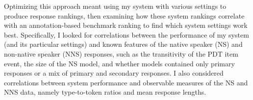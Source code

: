 Optimizing this approach meant using my system with various settings to produce response rankings, then examining how these system rankings correlate with an annotation-based benchmark ranking to find which system settings work best. Specifically, I looked for correlations between the performance of my system (and its particular settings) and known features of the native speaker (NS) and non-native speaker (NNS) responses, such as the transitivity of the PDT item event, the size of the NS model, and whether models contained only primary responses or a mix of primary and secondary responses. I also considered correlations between system performance and observable measures of the NS and NNS data, namely type-to-token ratios and mean response lengths.




